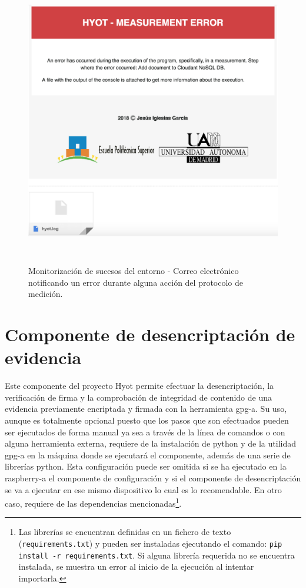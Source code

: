 \documentclass[12pt,a4paper, twoside]{report}
\begin{document}
			\begin{figure}[!ht]   
				\caption{Monitorización de sucesos del entorno - Correo electrónico notificando un error durante alguna acción del protocolo de medición.} 
				\begin{center} 
					\includegraphics[width=12cm,height=12cm]{Images/userGuide/monitoring/errorMail} \\
					\label{fig:userguide_monitoring_errorMail} 
				\end{center}  
			\end{figure}	 
	 
	 \newpage
	 
	 \section{Componente de desencriptación de evidencia}
	 	 
	 Este componente del proyecto Hyot permite efectuar la desencriptación, la verificación de firma y la comprobación de integridad de contenido de una evidencia previamente encriptada y firmada con la herramienta \gls{gpg-a}. Su uso, aunque es totalmente opcional puesto que los pasos que son efectuados pueden ser ejecutados de forma manual ya sea a través de la línea de comandos o con alguna herramienta externa, requiere de la instalación de \gls{python} y de la utilidad \gls{gpg-a} \cite{gpg} en la máquina donde se ejecutará el componente, además de una serie de librerías \gls{python}. Esta configuración puede ser omitida si se ha ejecutado en la \gls{raspberry-a} el componente de configuración y si el componente de desencriptación se va a ejecutar en ese mismo dispositivo lo cual es lo recomendable. En otro caso, requiere de las dependencias mencionadas\footnote{Las librerías se encuentran definidas en un fichero de texto (\texttt{requirements.txt}) y pueden ser instaladas ejecutando el comando: \texttt{pip install -r requirements.txt}. Si alguna librería requerida no se encuentra instalada, se muestra un error al inicio de la ejecución al intentar importarla.}. \\
	 
\end{document}
